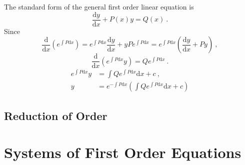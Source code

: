 \documentclass[11pt,a4paper]{article}
\newcommand{\dif}{\mathrm{d}}
\begin{document}
The standard form of the general first order linear equation is
\begin{equation}
\frac{\dif y}{\dif x} +P(x) y = Q(x) ~.
\end{equation}
Since
\begin{equation*}
\frac{\dif }{\dif x} \left(e^{\int P \dif x} \right) = e^{\int P \dif x} \frac{\dif y}{\dif x} +y Pe^{\int P \dif x} = e^{\int P \dif x} \left( \frac{\dif y}{\dif x} +Py\right) ~,
\end{equation*}
\begin{equation}
\frac{\dif }{\dif x} \left(e^{\int P \dif x} y \right) = Q e^{\int P \dif x} ~.
\end{equation}
\begin{align}
\nonumber e^{\int P \dif x} y &= \int Q e^{\int P \dif x}  \dif x +c ~, \\
y &= e^{-\int P \dif x} \left( \int Q e^{\int P \dif x}  \dif x +c \right)
\end{align}

\subsection{Reduction of Order}



































\section{Systems of First Order Equations}
\end{document}
